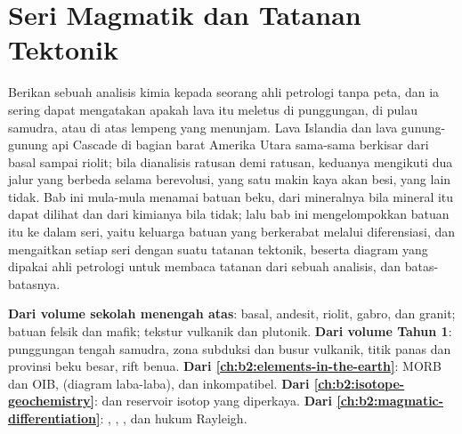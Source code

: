 \chapter{Seri Magmatik dan Tatanan Tektonik}\label{ch:b2:magmatic-series}

Berikan sebuah analisis kimia kepada seorang ahli petrologi tanpa peta, dan ia sering dapat mengatakan apakah
lava itu meletus di punggungan, di pulau samudra, atau di atas lempeng yang menunjam. Lava
Islandia dan lava gunung-gunung api Cascade di bagian barat Amerika Utara sama-sama berkisar
dari basal sampai riolit; bila dianalisis ratusan demi ratusan, keduanya mengikuti dua jalur yang berbeda selama
berevolusi, yang satu makin kaya akan besi, yang lain tidak. Bab ini mula-mula
menamai batuan beku, dari mineralnya bila mineral itu dapat dilihat dan dari
kimianya bila tidak; lalu bab ini mengelompokkan batuan itu ke dalam seri, yaitu keluarga batuan yang
berkerabat melalui diferensiasi, dan mengaitkan setiap seri dengan suatu tatanan tektonik, beserta
diagram yang dipakai ahli petrologi untuk membaca tatanan dari sebuah analisis, dan batas-batasnya.

\begin{recall}
\textbf{Dari volume sekolah menengah atas}: basal, andesit, riolit, gabro, dan granit;
batuan felsik dan mafik; tekstur vulkanik dan plutonik. \textbf{Dari volume Tahun
1}: punggungan tengah samudra, zona subduksi dan busur vulkanik, titik panas dan provinsi
beku besar, rift benua. \textbf{Dari \cref{ch:b2:elements-in-the-earth}}:
MORB dan OIB,   (diagram laba-laba),  dan
inkompatibel. \textbf{Dari \cref{ch:b2:isotope-geochemistry}}:  dan reservoir isotop yang diperkaya. \textbf{Dari
\cref{ch:b2:magmatic-differentiation}}: , , , dan hukum Rayleigh.
\end{recall}

